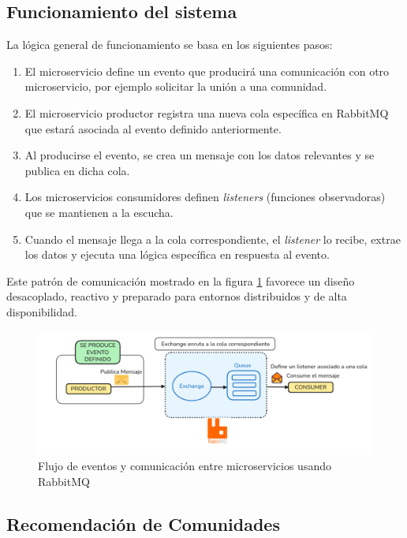 \subsection*{Funcionamiento del sistema}

La lógica general de funcionamiento se basa en los siguientes pasos:

\begin{enumerate}[label=\textbf{\arabic*.}]
    \item El microservicio define un evento que producirá una comunicación con otro microservicio, por ejemplo solicitar la unión a una comunidad.
    \item El microservicio productor registra una nueva cola específica en RabbitMQ que estará asociada al evento definido anteriormente.
    \item Al producirse el evento, se crea un mensaje con los datos relevantes y se publica en dicha cola.
    \item Los microservicios consumidores definen \textit{listeners} (funciones observadoras) que se mantienen a la escucha.
    \item Cuando el mensaje llega a la cola correspondiente, el \textit{listener} lo recibe, extrae los datos y ejecuta una lógica específica en respuesta al evento.
\end{enumerate}

Este patrón de comunicación mostrado en la figura \ref{fig:rabbitmqexpl} favorece un diseño desacoplado, reactivo y preparado para entornos distribuidos y de alta disponibilidad.

\begin{figure}[h!]
  \centering
  \includegraphics[width=1\textwidth]{fotos/rabbitmqexpl.png}
  \caption{Flujo de eventos y comunicación entre microservicios usando RabbitMQ}
  \label{fig:rabbitmqexpl}
\end{figure}
\subsection{Recomendación de Comunidades}

